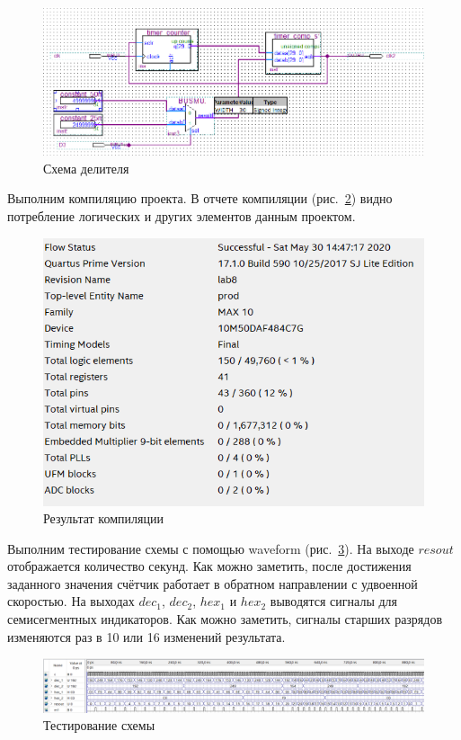 \documentclass[a4paper,14pt]{article}
\begin{document}
\begin{figure}[H]
	\centering
	\includegraphics[width=\linewidth]{image/schema_div}
	\caption{Схема делителя}
	\label{fig:schema_div}
\end{figure}

Выполним компиляцию проекта.
В отчете компиляции (рис.~\ref{fig:report}) видно потребление логических и других элементов данным проектом.

\begin{figure}[H]
	\centering
	\includegraphics[width=0.6\linewidth]{image/report}
	\caption{Результат компиляции}
	\label{fig:report}
\end{figure}

Выполним тестирование схемы с помощью waveform (рис.~\ref{fig:wave}).
На выходе $resout$ отображается количество секунд.
Как можно заметить, после достижения заданного значения счётчик работает в обратном направлении с удвоенной скоростью.
На выходах $dec_1$, $dec_2$, $hex_1$ и $hex_2$ выводятся сигналы для семисегментных индикаторов.
Как можно заметить, сигналы старших разрядов изменяются раз в 10 или 16 изменений результата.

\begin{figure}[H]
	\centering
	\includegraphics[width=\linewidth]{image/wave}
	\caption{Тестирование схемы}
	\label{fig:wave}
\end{figure}
\end{document}
